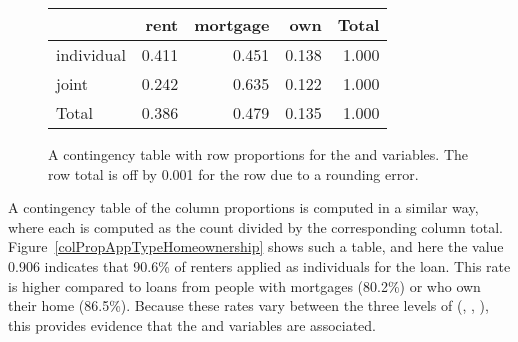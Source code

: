 \begin{figure}[h]
\centering
\begin{tabular}{l rrr r}
  \hline
  & rent & mortgage & own & Total \\
  \hline
  individual & 
      0.411 &
      0.451 &
      0.138 &
      1.000 \\
  joint &
      0.242 &
      0.635 &
      0.122 &
      1.000 \\
  \hline
  Total &
      0.386 &
      0.479 &
      0.135 &
      1.000 \\
  \hline
\end{tabular}
\caption{A contingency table with row proportions
    for the  and
     variables.
    The row total is off by 0.001 for the
     row due to a rounding error.}
\label{rowPropAppTypeHomeownership}
\end{figure}

A contingency table of the column proportions is computed in
a similar way, where each
is computed as the count divided by the corresponding column total.
Figure~\ref{colPropAppTypeHomeownership} shows such a table,
and here the value 0.906 indicates that 90.6\% of renters applied
as individuals for the loan.
This rate is higher compared to loans from people with
mortgages (80.2\%) or who own their home (86.5\%).
Because these rates vary between the three levels of
 (, , ),
this provides evidence that the  and
 variables are associated.


